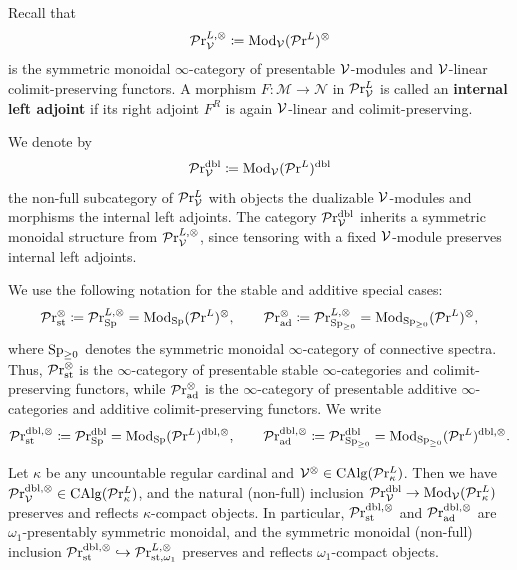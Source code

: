 \documentclass[10pt,a4paper,oneside]{article}
\begin{document}
\begin{de}
Recall that
\[
\pr_{\mcv}^{L,\otimes}\coloneqq\modu_{\mcv}(\prl)^\otimes
\]
is the symmetric monoidal $\infty$-category of presentable
$\mcv$-modules and $\mcv$-linear colimit-preserving functors. A morphism $F\colon \mathcal M\to \mathcal N$ in $\prl_{\mcv}$ is called an \textbf{internal left adjoint} if its right adjoint $F^R$ is again $\mcv$-linear and colimit-preserving.
\end{de}

\begin{nota}\label{dualdef}
We denote by
\[
\pr_{\mcv}^{\op{dbl}} \coloneqq \modu_{\mcv}(\prl)^{\op{dbl}}
\]
the non-full subcategory of $\prl_{\mcv}$ with objects the dualizable $\mcv$-modules and morphisms the internal left adjoints. The category $\pr_{\mcv}^{\op{dbl}}$ inherits a symmetric monoidal structure from $\pr_{\mathcal{V}}^{L,\otimes}$, since tensoring with a fixed $\mcv$-module preserves internal left adjoints.
\end{nota}

\begin{nota}
We use the following notation for the stable and additive special cases:
\[
\prst^\otimes \coloneqq \pr_{\opsp}^{L,\otimes} = \modu_{\opsp}(\prl)^\otimes,
\qquad
\prad^\otimes \coloneqq \pr_{\opsp_{\ge0}}^{L,\otimes} = \modu_{\opsp_{\ge0}}(\prl)^\otimes,
\]
where $\opsp_{\ge0}$ denotes the symmetric monoidal $\infty$-category of connective spectra. Thus, $\prst^\otimes$ is the $\infty$-category of presentable stable $\infty$-categories and colimit-preserving functors, while $\prad^\otimes$ is the $\infty$-category of presentable additive $\infty$-categories and additive colimit-preserving functors. We write
\[
\prst^{\op{dbl},\otimes} \coloneqq \pr_{\opsp}^{\op{dbl}} = \modu_{\opsp}(\prl)^{\op{dbl},\otimes},
\qquad
\pr_{\op{ad}}^{\op{dbl},\otimes} \coloneqq \pr_{\opsp_{\ge0}}^{\op{dbl}} = \modu_{\opsp_{\ge0}}(\prl)^{\op{dbl},\otimes}.
\]
\end{nota}

\begin{thm}\label{dualprl}
Let $\kappa$ be any uncountable regular cardinal and $\mcv^\otimes\in\calg(\prl_\kappa)$. Then we have $\pr^{\op{dbl},\otimes}_\mcv\in \calg(\prl_\kappa)$, and the natural (non-full) inclusion $\prvdbl\to \modu_{\mc{V}}(\prl_\kappa)$ preserves and reflects $\kappa$-compact objects. In particular, $\prst^{\op{dbl},\otimes}$ and $\prad^{\op{dbl},\otimes}$ are $\omega_1$-presentably symmetric monoidal, and the symmetric monoidal (non-full) inclusion $\prst^{\op{dbl},\otimes}\hookrightarrow \pr_{\op{st},\omega_1}^{L,\otimes}$ preserves and reflects $\omega_1$-compact objects.
\end{thm}
\end{document}
